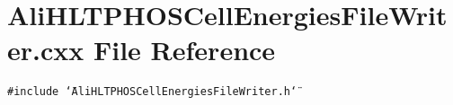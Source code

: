 \section{Ali\-HLTPHOSCell\-Energies\-File\-Writer.cxx File Reference}
\label{AliHLTPHOSCellEnergiesFileWriter_8cxx}


{\tt \#include \char`\"{}Ali\-HLTPHOSCell\-Energies\-File\-Writer.h\char`\"{}}\par
